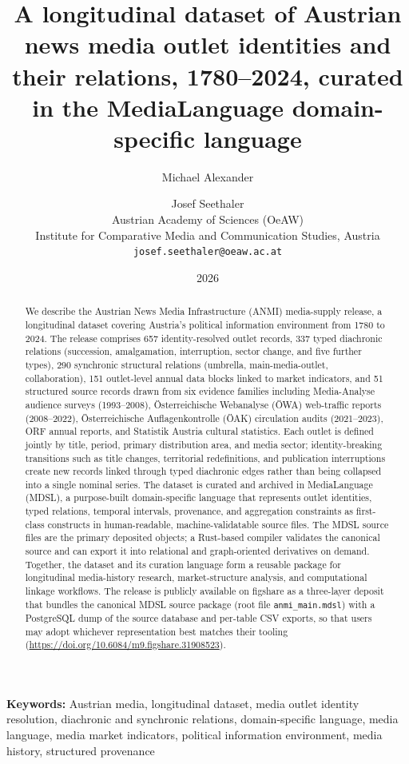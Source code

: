 \documentclass[11pt]{article}
\title{A longitudinal dataset of Austrian news media outlet identities and their relations, 1780--2024, curated in the MediaLanguage domain-specific language}
\author{Michael Alexander \and Josef Seethaler\\
Austrian Academy of Sciences (OeAW)\\
Institute for Comparative Media and Communication Studies, Austria\\
\texttt{josef.seethaler@oeaw.ac.at}}
\date{2026}
\begin{document}
\maketitle

\noindent\textbf{Keywords:} Austrian media, longitudinal dataset, media outlet identity resolution, diachronic and synchronic relations, domain-specific language, media language, media market indicators, political information environment, media history, structured provenance

\bigskip

\begin{abstract}
We describe the Austrian News Media Infrastructure (ANMI) media-supply release, a longitudinal dataset covering Austria's political information environment from 1780 to 2024. The release comprises 657 identity-resolved outlet records, 337 typed diachronic relations (succession, amalgamation, interruption, sector change, and five further types), 290 synchronic structural relations (umbrella, main-media-outlet, collaboration), 151 outlet-level annual data blocks linked to market indicators, and 51 structured source records drawn from six evidence families including Media-Analyse audience surveys (1993--2008), \"Osterreichische Webanalyse (\"OWA) web-traffic reports (2008--2022), \"Osterreichische Auflagenkontrolle (\"OAK) circulation audits (2021--2023), ORF annual reports, and Statistik Austria cultural statistics. Each outlet is defined jointly by title, period, primary distribution area, and media sector; identity-breaking transitions such as title changes, territorial redefinitions, and publication interruptions create new records linked through typed diachronic edges rather than being collapsed into a single nominal series. The dataset is curated and archived in MediaLanguage (MDSL), a purpose-built domain-specific language that represents outlet identities, typed relations, temporal intervals, provenance, and aggregation constraints as first-class constructs in human-readable, machine-validatable source files. The MDSL source files are the primary deposited objects; a Rust-based compiler validates the canonical source and can export it into relational and graph-oriented derivatives on demand. Together, the dataset and its curation language form a reusable package for longitudinal media-history research, market-structure analysis, and computational linkage workflows. The release is publicly available on figshare as a three-layer deposit that bundles the canonical MDSL source package (root file \texttt{anmi\_main.mdsl}) with a PostgreSQL dump of the source database and per-table CSV exports, so that users may adopt whichever representation best matches their tooling (\url{https://doi.org/10.6084/m9.figshare.31908523}).
\end{abstract}
\end{document}
